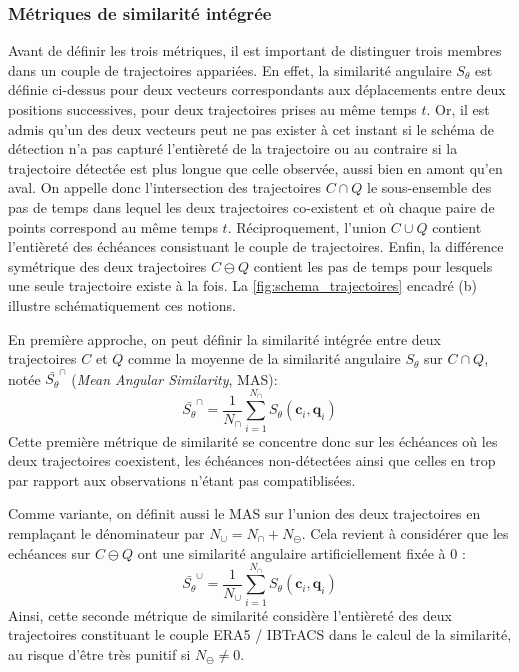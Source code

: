 \documentclass[../main.tex]{subfiles}
\begin{document}
\subsubsection*{Métriques de similarité intégrée}\label{sec:definition_MAS}

Avant de définir les trois métriques, il est important de distinguer trois membres dans un couple de trajectoires appariées. En effet, la similarité angulaire
$S_\theta$ est définie ci-dessus pour deux vecteurs correspondants aux déplacements entre deux positions successives, pour deux trajectoires prises au même
temps $t$. Or, il est admis qu'un des deux vecteurs peut ne pas exister à cet instant si le schéma de détection n'a pas capturé l'entièreté de la trajectoire ou
au contraire si la trajectoire détectée est plus longue que celle observée, aussi bien en amont qu'en aval. On appelle donc l'intersection des trajectoires $C
\cap Q$ le sous-ensemble des pas de temps dans lequel les deux trajectoires co-existent et où chaque paire de points correspond au même temps $t$.
Réciproquement, l'union $C \cup Q$ contient l'entièreté des échéances consistuant le couple de trajectoires. Enfin, la différence symétrique des deux
trajectoires $C \ominus Q$ contient les pas de temps pour lesquels une seule trajectoire existe à la fois. La \cref{fig:schema_trajectoires} encadré (b)
illustre schématiquement ces notions.

En première approche, on peut définir la similarité intégrée entre deux trajectoires $C$ et $Q$ comme la moyenne de la similarité angulaire $S_\theta$ sur $C
\cap Q$, notée $\bar{S_\theta}^\cap$ (\textit{Mean Angular Similarity}, MAS):
%
\begin{equation}
    \bar{S_\theta}^\cap = \frac{1}{N_\cap} \sum_{i=1}^{N_\cap} S_\theta (\mathbf{c}_i, \mathbf{q}_i) \tag*{MAS$^\cap$}
\end{equation}
%
Cette première métrique de similarité se concentre donc sur les échéances où les deux trajectoires coexistent, les échéances non-détectées ainsi que celles en
trop par rapport aux observations n'étant pas compatiblisées.

Comme variante, on définit aussi le MAS sur l'union des deux trajectoires en remplaçant le dénominateur par $N_\cup = N_\cap + N_\ominus$. Cela revient
à considérer que les echéances sur $C \ominus Q$ ont une similarité angulaire artificiellement fixée à \num{0} :
%
\begin{equation}
    \bar{S_\theta}^\cup = \frac{1}{N_\cup} \sum_{i=1}^{N_\cap} S_\theta (\mathbf{c}_i, \mathbf{q}_i) \tag*{MAS$^\cup$}
\end{equation}
%
Ainsi, cette seconde métrique de similarité considère l'entièreté des deux trajectoires constituant le couple ERA5 / IBTrACS dans le calcul de la similarité, au
risque d'être très punitif si $N_\ominus \neq 0$.
\end{document}
